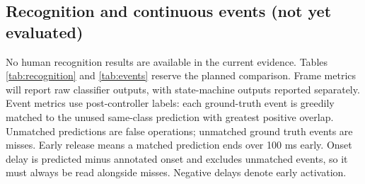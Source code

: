 \documentclass{article}
\newif\ifdraftnotes
\newcommand{\workitem}[7]{%
  \ifdraftnotes
  \begin{tcolorbox}[title={#1},title after break={#1 (continued)}]
  \textbf{Owner: }#2\par
  \textbf{Task: }#3\par
  \textbf{Protocol: }#4\par
  \textbf{Deliverables: }#5\par
  \textbf{Fill here: }#6\par
  \textbf{Done when: }#7
  \end{tcolorbox}
  \fi}
\newcommand{\code}[1]{\texttt{\detokenize{#1}}}
\begin{document}
\workitem{R1 | Audit evidence and validate the current version}
{E (name to be assigned); B checks the model pipeline.}
{Review automated and Blender integration evidence, recording the date, source version, machine, and configuration.}
{The 60 tests in the text refer to the current \code{.venv/bin/python -m pytest -q} audit. Historical evidence is in \code{runs/plasticity/v1/gui_test.json}: four operations, 16.479 ms, and 10,242 vertices. It has no source-hash field, so it does not establish that every current change was validated. Synthetic training evidence is in \code{runs/smoke_mlp/}, \code{runs/smoke_gru/}, and \code{runs/smoke_tcn/}; do not use it in the human comparison tables.}
{Current test logs, version, and conditions. Save any new GUI run in a separate directory without overwriting historical records. If illustrating deformation, use an actual Blender screenshot and identify synthetic or human input in the caption.}
{Update the test date and actual findings here; there is no need to enumerate every software test in the report.}
{Thursday, Oct. 22: every number is traceable, and historical checks not rerun remain explicitly historical.}

\subsection{Recognition and continuous events (not yet evaluated)}\label{sec:recognition}
No human recognition results are available in the current evidence. Tables
\ref{tab:recognition} and \ref{tab:events} reserve the planned comparison.
Frame metrics will report raw classifier outputs, with state-machine outputs
reported separately. Event metrics use post-controller labels: each ground-truth
event is greedily matched to the unused same-class prediction with greatest positive
overlap. Unmatched predictions are false operations; unmatched ground truth events
are misses. Early release means a matched prediction ends over 100 ms early.
Onset delay is predicted minus annotated onset and excludes unmatched events, so
it must always be read alongside misses. Negative delays denote early activation.
\end{document}
